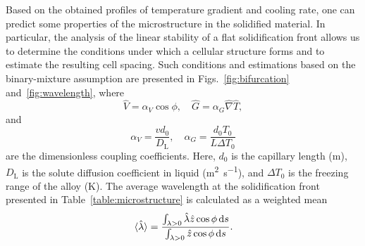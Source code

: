 \documentclass{article}
\newcommand{\liq}{\text{L}}
\begin{document}
Based on the obtained profiles of temperature gradient and cooling rate,
one can predict some properties of the microstructure in the solidified material.
In particular, the analysis of the linear stability of a flat solidification front allows us
to determine the conditions under which a cellular structure forms and to estimate the resulting cell spacing.
Such conditions and estimations based on the binary-mixture assumption are presented
in Figs.~\ref{fig:bifurcation} and~\ref{fig:wavelength}, where
\begin{equation}\label{eq:hatVG}
    \hat{V} = \alpha_V\cos\phi, \quad \hat{G} = \alpha_G\hat\nabla\hat{T},
\end{equation}
and
\begin{equation}\label{eq:alphaVG}
    \alpha_V = \frac{vd_0}{D_\liq}, \quad \alpha_G = \frac{d_0T_0}{L\Delta{T}_0}
\end{equation}
are the dimensionless coupling coefficients.
Here, $d_0$ is the capillary length (\si{\m}),
$D_\liq$ is the solute diffusion coefficient in liquid (\si{\m\squared\per\s}),
and $\Delta{T}_0$ is the freezing range of the alloy (\si{\K}).
The average wavelength at the solidification front presented in Table~\ref{table:microstructure}
is calculated as a weighted mean
\begin{equation}\label{eq:mean_wavelength}
    \ev*{\hat\lambda} = \frac{\int_{\lambda>0}\hat\lambda\hat{z}\cos\phi\dd{s}}{\int_{\lambda>0}\hat{z}\cos\phi\dd{s}}.
\end{equation}

\printbibliography
\end{document}
